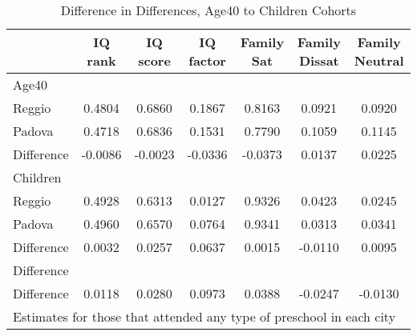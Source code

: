 \begin{table}[htbp]\centering
\caption{Difference in Differences, Age40 to Children Cohorts}
\begin{tabular}{l*{6}{c}}
\hline\hline
            &     IQ rank&    IQ score&   IQ factor&  Family Sat&Family Dissat&Family Neutral\\
\hline
Age40       &            &            &            &            &            &            \\
Reggio      &      0.4804&      0.6860&      0.1867&      0.8163&      0.0921&      0.0920\\
Padova      &      0.4718&      0.6836&      0.1531&      0.7790&      0.1059&      0.1145\\
Difference  &     -0.0086&     -0.0023&     -0.0336&     -0.0373&      0.0137&      0.0225\\
\hline
Children    &            &            &            &            &            &            \\
Reggio      &      0.4928&      0.6313&      0.0127&      0.9326&      0.0423&      0.0245\\
Padova      &      0.4960&      0.6570&      0.0764&      0.9341&      0.0313&      0.0341\\
Difference  &      0.0032&      0.0257&      0.0637&      0.0015&     -0.0110&      0.0095\\
\hline
Difference  &            &            &            &            &            &            \\
Difference  &      0.0118&      0.0280&      0.0973&      0.0388&     -0.0247&     -0.0130\\
\hline\hline
\multicolumn{7}{l}{\footnotesize Estimates for those that attended any type of preschool in each city}\\
\end{tabular}
\end{table}
